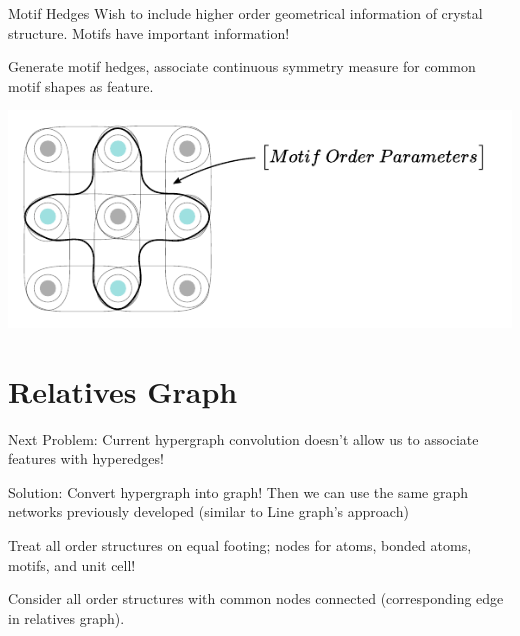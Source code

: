 \documentclass[11pt]{beamer}
\begin{document}
\begin{frame}{Motif Hedges}
Wish to include higher order geometrical information of crystal structure. Motifs have important information!

\vspace{0.5cm}\pause

Generate motif hedges, associate continuous symmetry measure for common motif shapes as feature.

\vspace{0.5cm}

\begin{center}
\includegraphics[scale=0.73]{motif.pdf}
\end{center}
\end{frame}



\section{Relatives Graph}
\begin{frame}
Next Problem: Current hypergraph convolution doesn't allow us to associate features with hyperedges!\pause

\vspace{.5cm}

Solution: Convert hypergraph into graph! \pause Then we can use the same graph networks previously developed (similar to Line graph's approach)

\vspace{.4cm}

Treat all order structures on equal footing; nodes for atoms, bonded atoms, motifs, and unit cell!

\vspace{.4cm}

Consider all order structures with common nodes connected (corresponding edge in relatives graph).
\end{frame}
\end{document}
